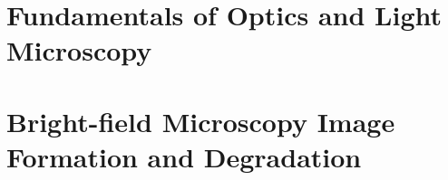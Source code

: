 \documentclass[mestrado, qualificacao]{packages/icmc}
\begin{document}
\textual

% 

\chapter{Fundamentals of Optics and Light Microscopy}
\label{chapter:fundamentals-of-optics-and-light-microscopy}


\chapter{Bright-field Microscopy Image Formation and Degradation}
\label{chapter:blur-characterization-and-image-formation}


% 

% 

% 

% 

% 
\end{document}
